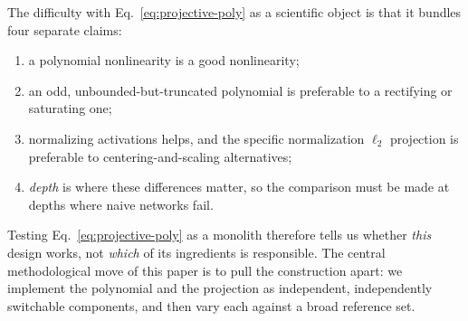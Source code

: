 The difficulty with Eq.~\eqref{eq:projective-poly} as a scientific object is
that it bundles four separate claims:
\begin{enumerate}
\item[(C1)] a polynomial nonlinearity is a good nonlinearity;
\item[(C2)] an odd, unbounded-but-truncated polynomial is preferable to a
  rectifying or saturating one;
\item[(C3)] normalizing activations helps, and the specific normalization
  $\ell_2$ projection is preferable to centering-and-scaling alternatives;
\item[(C4)] \emph{depth} is where these differences matter, so the comparison
  must be made at depths where naive networks fail.
\end{enumerate}
Testing Eq.~\eqref{eq:projective-poly} as a monolith therefore tells us
whether \emph{this} design works, not \emph{which} of its ingredients is
responsible. The central methodological move of this paper is to pull the
construction apart: we implement the polynomial and the projection as
independent, independently switchable components, and then vary each against a
broad reference set.

